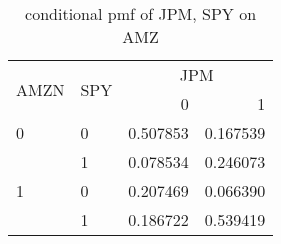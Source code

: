\documentclass[12pt,twoside]{article}
\begin{document}
\begin{enumerate}
\begin{enumerate}
\begin{table}[h]
\caption{conditional pmf of JPM, SPY on AMZ}
\centering
\begin{tabular}{llrr} 
\toprule 
\multirow{2}{*}{\parbox{4em}{AMZN}} & \multirow{2}{*}{\parbox{6em}{SPY}}  & \multicolumn{2}{c}{JPM}\\\cmidrule{3-4} 
 &  &  0 & 1\\ \midrule 
0  & 0 &  0.507853 & 0.167539\\ 
& 1 & 0.078534& 0.246073\\ 
1 & 0 &  0.207469 &  0.066390\\ 
& 1& 0.186722 &  0.539419\\\bottomrule 
\end{tabular}
\end{table}

\end{enumerate}
\end{enumerate}
\end{document}
